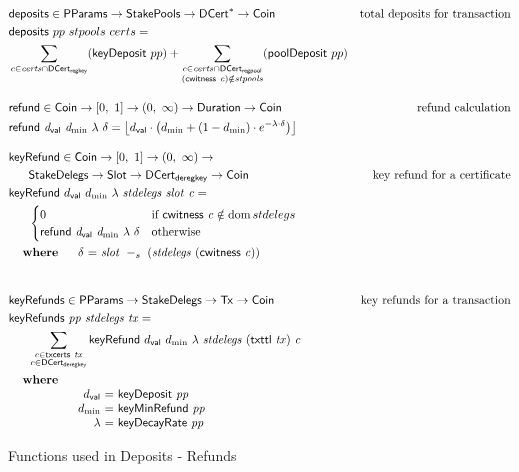 \begin{figure}[htb]
  \begin{align*}
    & \fun{deposits} \in \PParams \to \StakePools \to \seqof{\DCert} \to \Coin
    & \text{total deposits for transaction} \\
    & \fun{deposits}~{pp}~{stpools}~{certs} = \\
    &  \sum\limits_{c\in\var{certs} \cap \DCertRegKey}(\fun{keyDeposit}~pp)
    +  \sum\limits_{\substack{
         c\in\var{certs}\cap\DCertRegPool \\ (\cwitness{c})\notin \var{stpools}}}
         (\fun{poolDeposit}~pp)
      \nextdef
      & \fun{refund} \in \Coin \to \unitInterval \to \posReals \to \Duration \to \Coin
      & \text{refund calculation} \\
      & \refund{\dval}{d_{\min}}{\lambda}{\delta} =
            \floor*{
              \dval \cdot
            \left(d_{\min}+(1-d_{\min})\cdot e^{-\lambda\cdot\delta}\right)}
      \nextdef
      & \fun{keyRefund} \in \Coin \to \unitInterval \to \posReals \to \\
      & ~~~~~\StakeDelegs \to \Slot \to \DCertDeRegKey \to \Coin
      & \text{key refund for a certificate} \\
      & \keyRefund{\dval}{d_{\min}}{\lambda}{stdelegs}{slot}{c} =\\
      & ~~~~~\begin{cases}
            0 & \text{if}~\cwitness c \notin \dom stdelegs \\
            \refund{\dval}{d_{\min}}{\lambda}{\delta}
            & \text{otherwise}
        \end{cases}\\
      &
      \begin{array}{lr@{~=~}l}
        \where
        &\delta & \slotminus{slot}{(stdelegs~(\cwitness c))}\\
      \end{array}\\
      \nextdef
      & \fun{keyRefunds} \in \PParams \to \StakeDelegs \to \Tx \to \Coin
      & \text{key refunds for a transaction} \\
      & \keyRefunds{pp}{stdelegs}{tx} =\\
      & ~~~~~ \sum\limits_{\substack{c \in \txcerts{tx} \\ c\in\DCertDeRegKey}}
              \keyRefund{\dval}{d_{\min}}{\lambda}{stdelegs}{(\txttl{tx})}{c}\\
      &
      \begin{array}{lr@{~=~}l}
        \where \\
        & \dval & \fun{keyDeposit}~\var{pp}\\
        & d_{\min} & \fun{keyMinRefund}~\var{pp}\\
        & \lambda & \fun{keyDecayRate}~\var{pp}\\
      \end{array}\\
  \end{align*}
  \caption{Functions used in Deposits - Refunds}
  \label{fig:functions:deposits-refunds}
\end{figure}

